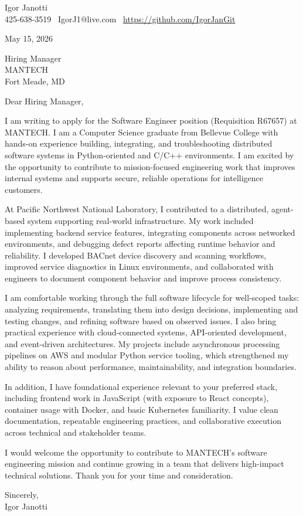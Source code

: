 \documentclass[11pt]{article}
\begin{document}
Igor Janotti\\
425-638-3519 \textbar\ IgorJ1@live.com \textbar\ \url{https://github.com/IgorJanGit}

May 15, 2026

Hiring Manager\\
MANTECH\\
Fort Meade, MD

Dear Hiring Manager,

I am writing to apply for the Software Engineer position (Requisition R67657) at MANTECH. I am a Computer Science graduate from Bellevue College with hands-on experience building, integrating, and troubleshooting distributed software systems in Python-oriented and C/C++ environments. I am excited by the opportunity to contribute to mission-focused engineering work that improves internal systems and supports secure, reliable operations for intelligence customers.

At Pacific Northwest National Laboratory, I contributed to a distributed, agent-based system supporting real-world infrastructure. My work included implementing backend service features, integrating components across networked environments, and debugging defect reports affecting runtime behavior and reliability. I developed BACnet device discovery and scanning workflows, improved service diagnostics in Linux environments, and collaborated with engineers to document component behavior and improve process consistency.

I am comfortable working through the full software lifecycle for well-scoped tasks: analyzing requirements, translating them into design decisions, implementing and testing changes, and refining software based on observed issues. I also bring practical experience with cloud-connected systems, API-oriented development, and event-driven architectures. My projects include asynchronous processing pipelines on AWS and modular Python service tooling, which strengthened my ability to reason about performance, maintainability, and integration boundaries.

In addition, I have foundational experience relevant to your preferred stack, including frontend work in JavaScript (with exposure to React concepts), container usage with Docker, and basic Kubernetes familiarity. I value clean documentation, repeatable engineering practices, and collaborative execution across technical and stakeholder teams.

I would welcome the opportunity to contribute to MANTECH's software engineering mission and continue growing in a team that delivers high-impact technical solutions. Thank you for your time and consideration.

Sincerely,\\
Igor Janotti
\end{document}
